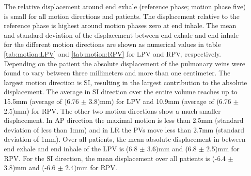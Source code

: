 \documentclass[type=dr, dr=rernat, accentcolor=tud7b,colorbacktitle, bigchapter, openright, twoside, 12pt ]{tudthesis}
\begin{document}
\vspace*{-0.8cm}

The relative displacement around end exhale (reference phase; motion phase five) is small for all motion directions 
and patients. The displacement relative to the reference phase is highest around motion phases zero at end inhale. \newline 
\newline
The mean and standard deviation of the displacement between end exhale and end inhale for the different motion directions 
are shown as numerical values in table \ref{tab:motion:LPV} and \ref{tab:motion:RPV} for LPV and RPV, respectively.
Depending on the patient the absolute displacement of the pulmonary veins were found to vary between three millimeters and more than 
one centimeter. The largest motion direction is SI, resulting in the largest contribution to the absolute displacement. The 
average in SI direction over the entire volume reaches up to 15.5mm (average of (6.76 $\pm$ 3.8)mm) for LPV and 10.9mm 
(average of (6.76 $\pm$ 2.5)mm) for RPV. The other two motion directions show a much smaller displacement. In AP direction the maximal 
motion is less than 2.5mm (standard deviation of less than 1mm) and in LR the PVs move less than 2.7mm (standard deviation of 1mm).\newline
\newline
Over all patients, the mean absolute displacement in-between end exhale and end inhale of the LPV is (6.8 $\pm$ 3.6)mm and 
(6.8 $\pm$ 2.5)mm for RPV. For the SI direction, the mean displacement over all patients is (-6.4 $\pm$ 3.8)mm and (-6.6 $\pm$ 2.4)mm for 
RPV.
\newpage

\end{document}
